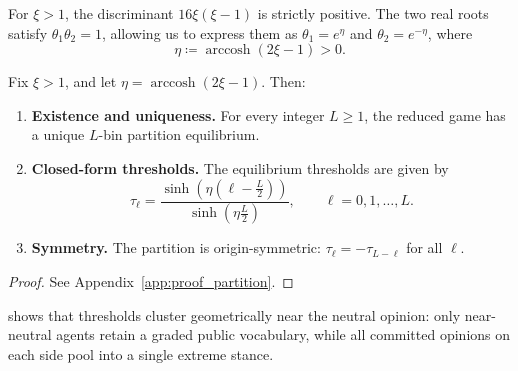 \documentclass[journal,twoside,web]{ieeecolor}
\begin{document}
For $\xi > 1$, the discriminant $16\xi(\xi-1)$ is strictly positive. The two real roots satisfy
$\theta_1 \theta_2 = 1$, allowing us to express them as $\theta_1 = e^{\eta}$ and $\theta_2 = e^{-\eta}$, where
\begin{equation}
    \label{eq:eta_def}
    \eta \coloneqq \operatorname{arccosh}(2\xi - 1) > 0.
\end{equation}

\begin{theorem}\label{thm:partition}
    Fix $\xi > 1$, and let $\eta = \operatorname{arccosh}(2\xi-1)$. Then:
    \begin{enumerate}[wide, label=\roman*), ref=(\roman*)]
        \item \textbf{Existence and uniqueness.} For every integer $L \geq 1$, the reduced game has a unique $L$-bin partition equilibrium.\label{thm:partition:1}
        \item \textbf{Closed-form thresholds.} The equilibrium thresholds are given by\label{thm:partition:2}
              \begin{equation}\label{eq:thresh_closed}
                  \tau_\ell= \frac{\sinh\left(\eta\left(\ell-\frac{L}{2}\right)\right)}{\sinh\left(\eta\frac{L}{2}\right)},
                  \qquad \ell = 0,1,\dots, L.
              \end{equation}
        \item \textbf{Symmetry.} The partition is origin-symmetric: $\tau_\ell = -\tau_{L-\ell}$ for all $\ell$.\label{thm:partition:3}
    \end{enumerate}
\end{theorem}

\begin{proof}
    See Appendix~\ref{app:proof_partition}.
\end{proof}

 shows that thresholds cluster geometrically near the neutral opinion: only near-neutral agents retain a graded public vocabulary, while all committed opinions on each side pool into a single extreme stance.
\end{document}
